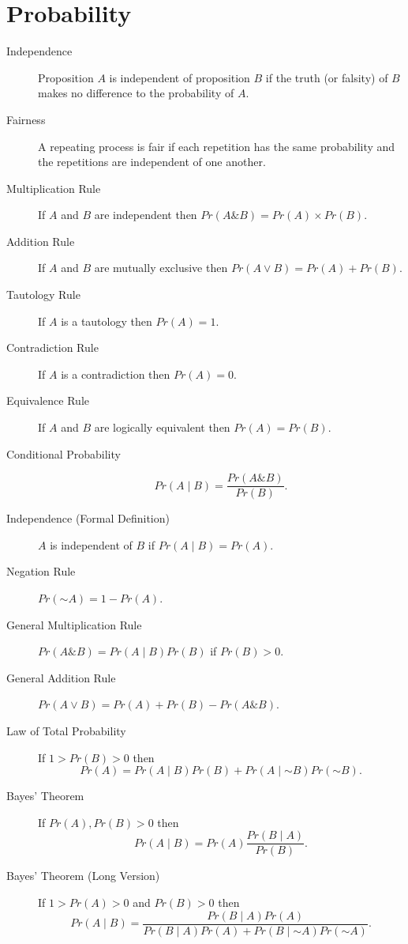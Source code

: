 \documentclass[justified]{tufte-book}
\newcommand{\given}{\mid}
\renewcommand{\neg}{\mathbin{\sim}}
\renewcommand{\wedge}{\mathbin{\&}}
\newcommand{\p}{Pr}
\theoremstyle{definition}
\theoremstyle{definition}
\theoremstyle{definition}
\theoremstyle{remark}
\begin{document}
\hypertarget{probability}{%
\section*{Probability}\label{probability}}

\begin{description}
\item[Independence]
Proposition \(A\) is independent of proposition \(B\) if the truth (or
falsity) of \(B\) makes no difference to the probability of \(A\).
\item[Fairness]
A repeating process is fair if each repetition has the same probability
and the repetitions are independent of one another.
\item[Multiplication Rule]
If \(A\) and \(B\) are independent then
\(\p(A \wedge B) = \p(A) \times \p(B)\).
\item[Addition Rule]
If \(A\) and \(B\) are mutually exclusive then
\(\p(A \vee B) = \p(A) + \p(B)\).
\item[Tautology Rule]
If \(A\) is a tautology then \(\p(A) = 1\).
\item[Contradiction Rule]
If \(A\) is a contradiction then \(\p(A) = 0\).
\item[Equivalence Rule]
If \(A\) and \(B\) are logically equivalent then \(\p(A) = \p(B)\).
\item[Conditional Probability]
\[\p(A \given B) = \frac{\p(A \wedge B)}{\p(B)}.\]
\item[Independence (Formal Definition)]
\(A\) is independent of \(B\) if \(\p(A \given B) = \p(A)\).
\item[Negation Rule]
\(\p(\neg A) = 1 - \p(A)\).
\item[General Multiplication Rule]
\(\p(A \wedge B) = \p(A \given B) \p(B)\) if \(\p(B) > 0\).
\item[General Addition Rule]
\(\p(A \vee B) = \p(A) + \p(B) - \p(A \wedge B)\).
\item[Law of Total Probability]
If \(1 > \p(B) > 0\) then
\[\p(A) = \p(A \given B)\p(B) + \p(A \given \neg B)\p(\neg B).\]
\item[Bayes' Theorem]
If \(\p(A), \p(B) > 0\) then
\[\p(A \given B) = \p(A) \frac{\p(B \given A)}{\p(B)}.\]
\item[Bayes' Theorem (Long Version)]
If \(1 > \p(A) > 0\) and \(\p(B) > 0\) then
\[\p(A \given B) = \frac{\p(B \given A)\p(A)}{\p(B \given A)\p(A) + \p(B \given \neg A)\p(\neg A)}.\]
\end{description}
\end{document}
